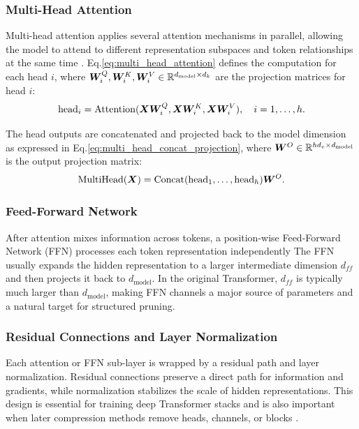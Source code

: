 \subsubsection{Multi-Head Attention}

Multi-head attention applies several attention mechanisms in parallel, allowing the model to attend to different representation subspaces and token relationships at the same time \cite{vaswani2017attention}. Eq.\eqref{eq:multi_head_attention} defines the computation for each head $i$, where $\bm{W}^{Q}_{i}, \bm{W}^{K}_{i}, \bm{W}^{V}_{i} \in \mathbb{R}^{d_{\text{model}} \times d_k}$ are the projection matrices for head $i$:
\begin{equation}
  \label{eq:multi_head_attention}
    \operatorname{head}_i =
    \operatorname{Attention}(\bm{X}\bm{W}^{Q}_{i}, \bm{X}\bm{W}^{K}_{i}, \bm{X}\bm{W}^{V}_{i}),
    \quad i = 1,\ldots,h.
\end{equation}

The head outputs are concatenated and projected back to the model dimension as expressed in Eq.\eqref{eq:multi_head_concat_projection}, where $\bm{W}^{O} \in \mathbb{R}^{hd_v \times d_{\text{model}}}$ is the output projection matrix:
\begin{equation}
  \label{eq:multi_head_concat_projection}
    \operatorname{MultiHead}(\bm{X}) =
    \operatorname{Concat}(\operatorname{head}_1,\ldots,\operatorname{head}_h)\bm{W}^{O}.
\end{equation}
\subsubsection{Feed-Forward Network}

After attention mixes information across tokens, a position-wise Feed-Forward Network (FFN) processes each token representation independently
The FFN usually expands the hidden representation to a larger intermediate dimension $d_{ff}$ and then projects it back to $d_{\text{model}}$. In the original Transformer, $d_{ff}$ is typically much larger than $d_{\text{model}}$, making FFN channels a major source of parameters and a natural target for structured pruning.

\subsubsection{Residual Connections and Layer Normalization}

Each attention or FFN sub-layer is wrapped by a residual path and layer normalization. Residual connections preserve a direct path for information and gradients, while normalization stabilizes the scale of hidden representations. This design is essential for training deep Transformer stacks and is also important when later compression methods remove heads, channels, or blocks \cite{vaswani2017attention,He2016,Ba2016}.

